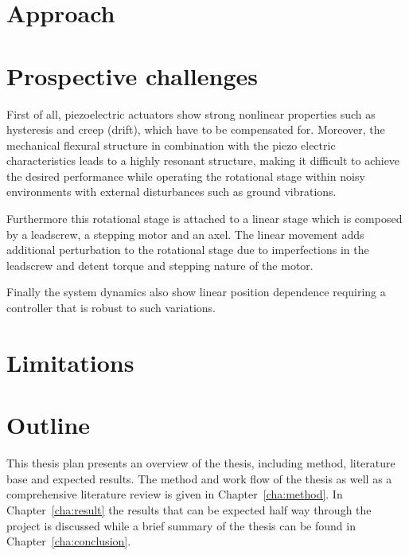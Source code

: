 \section{Approach}

\section{Prospective challenges}
First of all, piezoelectric  actuators show strong nonlinear properties such as hysteresis and creep (drift), which have to be compensated for. Moreover, the mechanical flexural structure in combination with the piezo electric characteristics leads to a highly resonant structure, making it difficult to achieve the desired performance while operating the rotational stage within noisy environments with external disturbances such as ground vibrations.

Furthermore this rotational stage is attached to a linear stage which is composed by a leadscrew, a stepping motor and an axel. The linear movement adds additional perturbation to the rotational stage due to imperfections in the leadscrew and detent torque and stepping nature of the motor.

Finally the system dynamics also show linear position dependence requiring a controller that is robust to such variations.

\section{Limitations}

\section{Outline}
This thesis plan presents an overview of the thesis, including method, literature base and expected results. The method and work flow of the thesis as well as a comprehensive literature review is given in Chapter~\ref{cha:method}. In Chapter~\ref{cha:result} the results that can be expected half way through the project is discussed while a brief summary of the thesis can be found in Chapter~\ref{cha:conclusion}.
